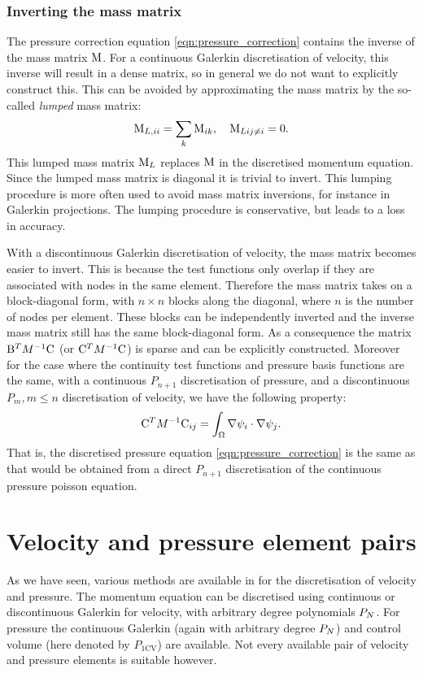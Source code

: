 \subsubsection{Inverting the mass matrix}
\label{sec:ND_cg_mass_lumping}
The pressure correction equation \eqref{eqn:pressure_correction} contains
the inverse of the mass matrix $\mathrm{M}$. For a continuous Galerkin
discretisation of velocity, this inverse will result in a dense
matrix, so in general we do not want to explicitly construct
this. This can be avoided by approximating the mass matrix by the
so-called \emph{lumped} mass matrix:
\begin{equation*}
  \mathrm{M}_{L,ii}=\sum_k \mathrm{M}_{ik},\quad \mathrm{M}_{Lij\neq i}=0.
\end{equation*}
This lumped mass matrix $\mathrm{M}_L$ replaces $\mathrm{M}$ in the
discretised momentum equation. Since the lumped mass matrix is
diagonal it is trivial to invert. This lumping procedure is more
often used to avoid mass matrix inversions, for instance in
Galerkin projections. The lumping procedure is conservative,
but leads to a loss in accuracy.

With a discontinuous Galerkin discretisation of velocity, the mass matrix
becomes easier to invert. This is because the test functions only overlap
if they are associated with nodes in the same element. Therefore the mass
matrix takes on a block-diagonal form, with $n\times n$ blocks along
the diagonal, where $n$ is the number of nodes per element. These blocks
can be independently inverted and the inverse mass matrix still has the
same block-diagonal form. As a consequence the matrix
$\mathrm{B}^T M^{-1} \mathrm{C}$ (or $\mathrm{C}^T M^{-1} \mathrm{C}$) is sparse and can be explicitly
constructed. Moreover for the case where the continuity test functions and pressure
basis functions are the same, with a continuous $P_{n+1}$ discretisation of pressure,
and a discontinuous $P_m, m\leq n$ discretisation of velocity, we
have the following property\citep{cotter2009}:
\begin{equation*}
  \mathrm{C}^T M^{-1} \mathrm{C}_{ij}=\int_\Omega \nabla \psi_i\cdot\nabla \psi_j.
\end{equation*}
That is, the discretised pressure equation \eqref{eqn:pressure_correction}
is the same as that would be obtained from a direct $P_{n+1}$
discretisation of the continuous pressure poisson equation.

\section{Velocity and pressure element pairs}
\label{sec:velocity_pressure_element_pairs}
As we have seen, various methods are available in \fluidity for the discretisation of
velocity and pressure. The momentum equation can be discretised
using continuous or discontinuous Galerkin for velocity, with arbitrary degree
polynomials $P_N$. For pressure the continuous Galerkin (again with arbitrary degree $P_N$)
and control volume (here denoted by $P_{1\text{CV}}$) are available. Not every available
pair of velocity and pressure elements is suitable however.


